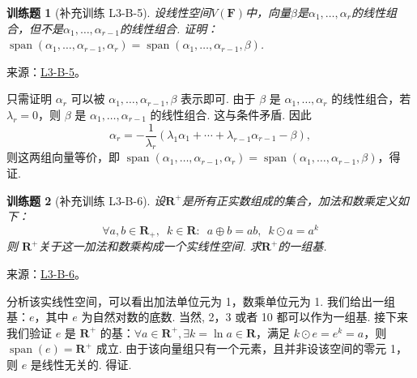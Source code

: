 \documentclass[UTF8,12pt,a4paper,fontset=fandol]{ctexart}
\newtheorem{exercise}{训练题}[section]
\begin{document}
\begin{exercise}[补充训练 L3-B-5]\label{prob:L3-B-5}
设线性空间$V(\mathbf{F})$中，向量$\beta$是$\alpha_1,\ldots,\alpha_r$的线性组合，但不是$\alpha_1,\ldots,\alpha_{r-1}$的线性组合. 证明：$\operatorname{span}(\alpha_1,\ldots,\alpha_{r-1},\alpha_r)=\operatorname{span}(\alpha_1,\ldots,\alpha_{r-1},\beta)$.
\end{exercise}
\noindent 来源：\href{https://github.com/yhwu-is/Linear-Algebra-Left-Undone/blob/new/%E8%AE%B2%E4%B9%89/%E4%B8%93%E9%A2%98/3%20%E6%9C%89%E9%99%90%E7%BB%B4%E7%BA%BF%E6%80%A7%E7%A9%BA%E9%97%B4.tex}{L3-B-5}。
\begin{solve}
只需证明 $\alpha_r$ 可以被 $\alpha_1,\ldots,\alpha_{r-1},\beta$ 表示即可. 由于 $\beta$ 是 $\alpha_1,\ldots,\alpha_r$ 的线性组合，若 $\lambda_r=0$，则 $\beta$ 是 $\alpha_1,\ldots,\alpha_{r-1}$ 的线性组合. 这与条件矛盾. 因此 \[\alpha_r=-\dfrac 1{\lambda_r}(\lambda_1\alpha_1+\cdots+\lambda_{r-1}\alpha_{r-1}-\beta),\] 则这两组向量等价，即 $\operatorname{span}(\alpha_1,\ldots,\alpha_{r-1},\alpha_r)=\operatorname{span}(\alpha_1,\ldots,\alpha_{r-1},\beta)$，得证.
\end{solve}

\begin{exercise}[补充训练 L3-B-6]\label{prob:L3-B-6}
\label{item:3:正实数线性空间}
        设$\mathbf{R}^+$是所有正实数组成的集合，加法和数乘定义如下：
        \[ \forall a,b \in \mathbf{R}_+,\enspace k\in \mathbf{R}\colon\enspace a\oplus b = ab,\enspace k\odot a = a^k \]
        则 $\mathbf{R}^+$关于这一加法和数乘构成一个实线性空间. 求$\mathbf{R}^+$的一组基.
\end{exercise}
\noindent 来源：\href{https://github.com/yhwu-is/Linear-Algebra-Left-Undone/blob/new/%E8%AE%B2%E4%B9%89/%E4%B8%93%E9%A2%98/3%20%E6%9C%89%E9%99%90%E7%BB%B4%E7%BA%BF%E6%80%A7%E7%A9%BA%E9%97%B4.tex}{L3-B-6}。
\begin{solve}
分析该实线性空间，可以看出加法单位元为 1，数乘单位元为 1. 我们给出一组基：$e$，其中 $e$ 为自然对数的底数. 当然, 2，3 或者 10 都可以作为一组基. 接下来我们验证 $e$ 是 $\mathbf{R}^+$ 的基：$\forall a\in \mathbf{R}^+,\exists k=\ln a\in\mathbf{R}$，满足 $k\odot e=e^k=a$，则 $\operatorname{span}(e)=\mathbf{R}^+$ 成立. 由于该向量组只有一个元素，且并非设该空间的零元 1，则 $e$ 是线性无关的. 得证.
\end{solve}
\end{document}
